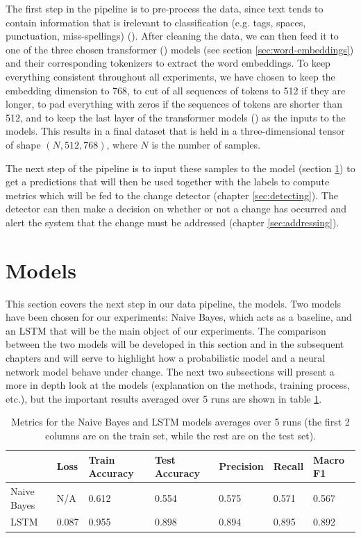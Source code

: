 \documentclass[12pt]{extreport}
\begin{document}
The first step in the pipeline is to pre-process the data, since text tends to contain information that is irelevant to classification (e.g. tags, spaces, punctuation, miss-spellings) (\cite{textclassification}). After cleaning the data, we can then feed it to one of the three chosen transformer (\cite{huggingface}) models (see section \ref{sec:word-embeddings}) and their corresponding tokenizers to extract the word embeddings. To keep everything consistent throughout all experiments, we have chosen to keep the embedding dimension to 768, to cut of all sequences of tokens to 512 if they are longer, to pad everything with zeros if the sequences of tokens are shorter than 512, and to keep the last layer of the transformer models (\cite{attention}) as the inputs to the models. This results in a final dataset that is held in a three-dimensional tensor of shape $(N, 512, 768)$, where $N$ is the number of samples.

The next step of the pipeline is to input these samples to the model (section \ref{sec:models}) to get a predictions that will then be used together with the labels to compute metrics which will be fed to the change detector (chapter \ref{sec:detecting}). The detector can then make a decision on whether or not a change has occurred and alert the system that the change must be addressed (chapter \ref{sec:addressing}).

\section{Models} \label{sec:models}

This section covers the next step in our data pipeline, the models. Two models have been chosen for our experiments: Naive Bayes, which acts as a baseline, and an LSTM that will be the main object of our experiments. The comparison between the two models will be developed in this section and in the subsequent chapters and will serve to highlight how a probabilistic model and a neural network model behave under change. The next two subsections will present a more in depth look at the models (explanation on the methods, training process, etc.), but the important results averaged over 5 runs are shown in table \ref{table:model-metrics}.

\begin{table}[ht!]
\centering
\begin{tabular}{|l|l|l|l|l|l|l|}
\hline
            & Loss & Train Accuracy & Test Accuracy & Precision & Recall & Macro F1 \\ \hline
Naive Bayes & N/A        & 0.612          & 0.554         & 0.575          & 0.571       & 0.567         \\ \hline
LSTM        & 0.087      & 0.955          & 0.898         & 0.894          & 0.895       & 0.892         \\ \hline
\end{tabular}
\caption{Metrics for the Naive Bayes and LSTM models averages over 5 runs (the first 2 columns are on the train set, while the rest are on the test set).}
\label{table:model-metrics}
\end{table}
\end{document}
